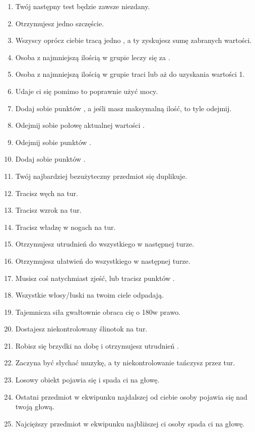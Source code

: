 \begin{enumerate}
	\item Twój następny test \abt{} będzie zawsze niezdany.
	\item Otrzymujesz jedno szczęście.
	\item Wszyscy oprócz ciebie tracą jedno \abzyc{}, a ty zyskujesz sumę zabranych wartości.
	\item Osoba z najmniejszą ilością \abzyc{} w grupie leczy się za \dvi{}.
	\item Osoba z najmniejszą ilością \abzyc{} w grupie traci \dvi{} lub aż do uzyskania wartości 1.
	\item Udaje ci się pomimo to poprawnie użyć mocy.
	\item Dodaj sobie \dvi{} punktów \abzyc{}, a jeśli masz maksymalną ilość, to tyle odejmij.
	\item Odejmij sobie połowę aktualnej wartości \abzyc{}.
	\item Odejmij sobie \diiii{} punktów \abzyc{}.
	\item Dodaj sobie \diiii{} punktów \abzyc{}.
	\item Twój najbardziej bezużyteczny przedmiot się duplikuje.
	\item Tracisz węch na \dvi{} tur.
	\item Tracisz wzrok na \dvi{} tur.
	\item Tracisz władzę w nogach na \dvi{} tur.
	\item Otrzymujesz \diiii{} utrudnień do wszystkiego w następnej turze.
	\item Otrzymujesz \diiii{} ułatwień do wszystkiego w następnej turze.
	\item Musisz coś natychmiast zjeść, lub tracisz \diiii{} punktów \abzyc{}.
	\item Wszystkie włosy/łuski na twoim ciele odpadają.
	\item Tajemnicza siła gwałtownie obraca cię o 180\textdegree w prawo.
	\item Dostajesz niekontrolowany ślinotok na \dxx{} tur.
	\item Robisz się brzydki na dobę i otrzymujesz \diiii{} utrudnień \abt{}.
	\item Zaczyna być słychać muzykę, a ty niekontrolowanie tańczysz przez \dvi{} tur.
	\item Losowy obiekt pojawia się i spada ci na głowę.
	\item Ostatni przedmiot w ekwipunku najdalszej od ciebie osoby pojawia się nad twoją głową.
	\item Najcięższy przedmiot w ekwipunku najbliższej ci osoby spada ci na głowę.

\end{enumerate}

